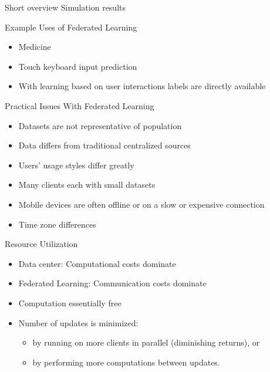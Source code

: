 \documentclass{beamer}{}
\begin{document}
\begin{frame} {Short overview Simulation results}
    \par
    \par
\end{frame}
    \begin{frame} {Example Uses of Federated Learning}
        \begin{itemize}[<+->]
            \item Medicine
            \item Touch keyboard input prediction
            \vspace{1.5em}
            \item With learning based on user interactions labels are directly available
        \end{itemize}
    \end{frame}
    \begin{frame} {Practical Issues With Federated Learning}
        \begin{itemize}[<+->]
            \item Datasets are not representative of population
            \item Data differs from traditional centralized sources
            \item Users' usage styles differ greatly
            \item Many clients each with small datasets
            \item Mobile devices are often offline or on a slow or expensive connection
            \item Time zone differences
        \end{itemize}
    \end{frame}
    \begin{frame} {Resource Utilization}
        \begin{itemize}[<+->]
            \item Data center: Computational costs dominate
            \item Federated Learning: Communication costs dominate
            \item Computation essentially free
            \item Number of updates is minimized:
            \begin{itemize}
                \item by running on more clients in parallel (diminishing returns), or
                \item by performing more computations between updates.
            \end{itemize}
        \end{itemize}
    \end{frame}
\end{document}
